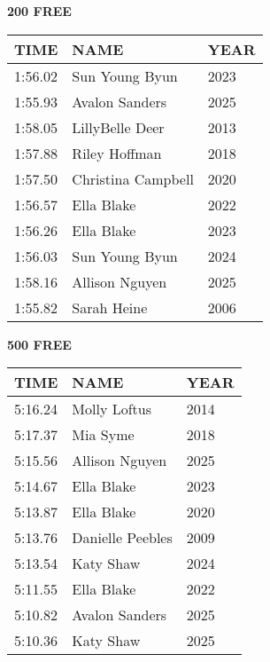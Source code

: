 \vspace{0.4cm}

\begin{minipage}[t]{0.48\textwidth}
\centering
\textbf{200 FREE}\\[0.05cm]
\begin{tabular}{@{}p{1.8cm}p{2.8cm}p{1.2cm}@{}}
\hline
\textbf{TIME} & \textbf{NAME} & \textbf{YEAR} \\
\hline
1:56.02 & Sun Young Byun & 2023 \\
1:55.93 & Avalon Sanders & 2025 \\
1:58.05 & LillyBelle Deer & 2013 \\
1:57.88 & Riley Hoffman & 2018 \\
1:57.50 & Christina Campbell & 2020 \\
1:56.57 & Ella Blake & 2022 \\
1:56.26 & Ella Blake & 2023 \\
1:56.03 & Sun Young Byun & 2024 \\
1:58.16 & Allison Nguyen & 2025 \\
1:55.82 & Sarah Heine & 2006 \\
\hline
\end{tabular}
\end{minipage}\hfill
\begin{minipage}[t]{0.48\textwidth}
\centering
\textbf{500 FREE}\\[0.05cm]
\begin{tabular}{@{}p{1.8cm}p{2.8cm}p{1.2cm}@{}}
\hline
\textbf{TIME} & \textbf{NAME} & \textbf{YEAR} \\
\hline
5:16.24 & Molly Loftus & 2014 \\
5:17.37 & Mia Syme & 2018 \\
5:15.56 & Allison Nguyen & 2025 \\
5:14.67 & Ella Blake & 2023 \\
5:13.87 & Ella Blake & 2020 \\
5:13.76 & Danielle Peebles & 2009 \\
5:13.54 & Katy Shaw & 2024 \\
5:11.55 & Ella Blake & 2022 \\
5:10.82 & Avalon Sanders & 2025 \\
5:10.36 & Katy Shaw & 2025 \\
\hline
\end{tabular}
\end{minipage}

\vspace{0.4cm}

